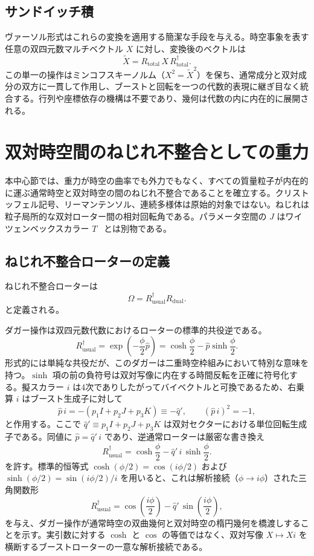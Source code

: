 \documentclass[a4paper]{article}
\begin{document}
\subsection{サンドイッチ積}

ヴァーソル形式はこれらの変換を適用する簡潔な手段を与える。時空事象を表す任意の双四元数マルチベクトル $X$ に対し、変換後のベクトルは
\[
\tilde{X} = R_\text{total} \, X \, R_\text{total}^\dagger.
\]
この単一の操作はミンコフスキーノルム（$X^2 = \tilde{X}^2$）を保ち、通常成分と双対成分の双方に一貫して作用し、ブーストと回転を一つの代数的表現に継ぎ目なく統合する。行列や座標依存の機構は不要であり、幾何は代数の内に内在的に展開される。

\section{双対時空間のねじれ不整合としての重力}
\label{sec:gravity}

本中心節では、重力が時空の曲率でも外力でもなく、すべての質量粒子が内在的に運ぶ通常時空と双対時空の間のねじれ不整合であることを確立する。クリストッフェル記号、リーマンテンソル、連続多様体は原始的対象ではない。ねじれは粒子局所的な双対ローター間の相対回転角である。パラメータ空間の $J$ はワイツェンベックスカラー $T$~\cite{weitzenboeck1923,maluf2013} とは別物である。

\subsection{ねじれ不整合ローターの定義}

ねじれ不整合ローターは
\[
\Omega = R_\text{usual}^\dagger R_\text{dual}.
\]
と定義される。

ダガー操作は双四元数代数におけるローターの標準的共役逆である。
\[
R_\text{usual}^\dagger = \exp\!\left( -\frac{\phi}{2} \hat{p} \right)
= \cosh\frac{\phi}{2} - \hat{p} \sinh\frac{\phi}{2}.
\]
形式的には単純な共役だが、このダガーは二重時空枠組みにおいて特別な意味を持つ。$\sinh$ 項の前の負符号は双対写像に内在する時間反転を正確に符号化する。擬スカラー $i$ は4次でありしたがってバイベクトルと可換であるため、右乗算 $i$ はブースト生成子に対して
\[
\hat{p}\, i = - (p_1 I + p_2 J + p_3 K) \equiv -\hat{q}',
\qquad (\hat{p}\, i)^2 = -1,
\]
と作用する。ここで $\hat{q}' \equiv p_1 I + p_2 J + p_3 K$ は双対セクターにおける単位回転生成子である。同値に $\hat{p} = \hat{q}'\, i$ であり、逆通常ローターは厳密な書き換え
\[
R_\text{usual}^\dagger = \cosh\frac{\phi}{2} - \hat{q}'\, i\, \sinh\frac{\phi}{2}.
\]
を許す。標準的恒等式 $\cosh(\phi/2) = \cos(i\phi/2)$ および $\sinh(\phi/2) = \sin(i\phi/2)/i$ を用いると、これは解析接続（$\phi \to i\phi$）された三角関数形
\[
R_\text{usual}^\dagger = \cos\!\left(\frac{i\phi}{2}\right) - \hat{q}'\, \sin\!\left(\frac{i\phi}{2}\right),
\]
を与え、ダガー操作が通常時空の双曲幾何と双対時空の楕円幾何を橋渡しすることを示す。実引数に対する $\cosh$ と $\cos$ の等価ではなく、双対写像 $X \mapsto X i$ を横断するブーストローターの一意な解析接続である。
\end{document}
